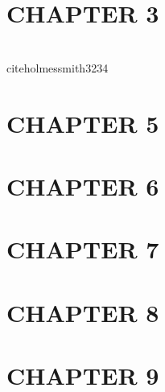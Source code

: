 
%
%
\chapter{CHAPTER 3}

\\cite{holmessmith3234}


\chapter{CHAPTER 5}


\chapter{CHAPTER 6}


\chapter{CHAPTER 7}


\chapter{CHAPTER 8}


\chapter{CHAPTER 9}


